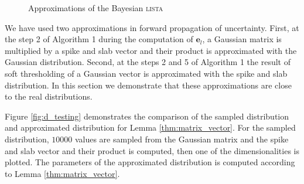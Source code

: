 \documentclass{article}
\begin{document}
\begin{figure}[h]
\caption{Approximations of the Bayesian \textsc{lista}}
\end{figure}

We have used two approximations in forward propagation of uncertainty. First, at the step 2 of Algorithm 1 during the computation of $\mathbf{e}_l$, a Gaussian matrix is multiplied by a spike and slab vector and their product is approximated with the Gaussian distribution. Second, at the steps 2 and 5 of Algorithm 1 the result of soft thresholding of a Gaussian vector is approximated with the spike and slab distribution. In this section we demonstrate that these approximations are close to the real distributions.

Figure \ref{fig:d_testing} demonstrates the comparison of the sampled distribution and approximated distribution for Lemma \ref{thm:matrix_vector}. For the sampled distribution, $10000$ values are sampled from the Gaussian matrix and the spike and slab vector and their product is computed, then one of the dimensionalities is plotted. The parameters of the approximated distribution is computed according to Lemma \ref{thm:matrix_vector}.
\end{document}
